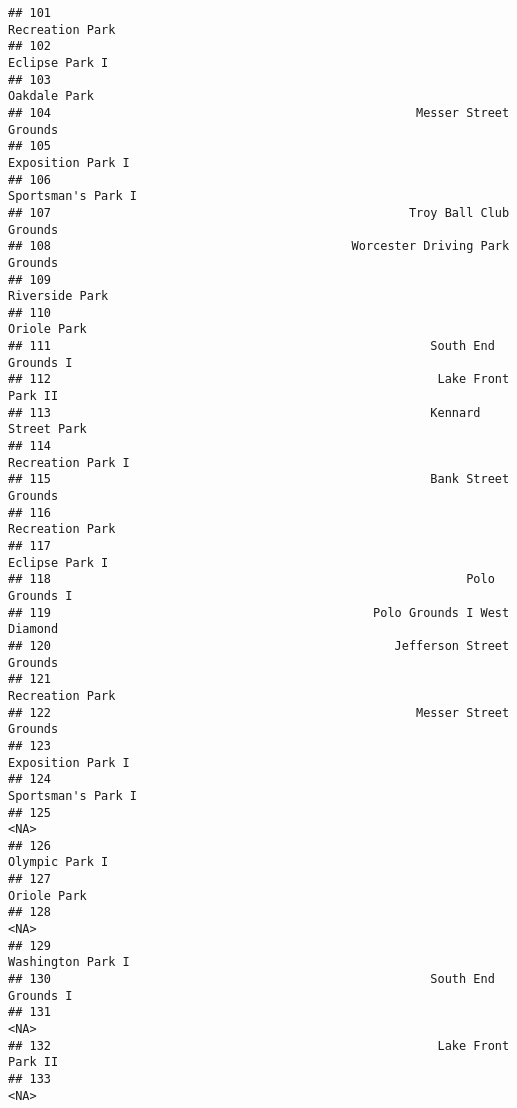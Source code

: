 \documentclass[]{article}
\begin{document}
\begin{verbatim}
## 101                                                         Recreation Park
## 102                                                          Eclipse Park I
## 103                                                            Oakdale Park
## 104                                                   Messer Street Grounds
## 105                                                       Exposition Park I
## 106                                                      Sportsman's Park I
## 107                                                  Troy Ball Club Grounds
## 108                                          Worcester Driving Park Grounds
## 109                                                          Riverside Park
## 110                                                             Oriole Park
## 111                                                     South End Grounds I
## 112                                                      Lake Front Park II
## 113                                                     Kennard Street Park
## 114                                                       Recreation Park I
## 115                                                     Bank Street Grounds
## 116                                                         Recreation Park
## 117                                                          Eclipse Park I
## 118                                                          Polo Grounds I
## 119                                             Polo Grounds I West Diamond
## 120                                                Jefferson Street Grounds
## 121                                                         Recreation Park
## 122                                                   Messer Street Grounds
## 123                                                       Exposition Park I
## 124                                                      Sportsman's Park I
## 125                                                                    <NA>
## 126                                                          Olympic Park I
## 127                                                             Oriole Park
## 128                                                                    <NA>
## 129                                                       Washington Park I
## 130                                                     South End Grounds I
## 131                                                                    <NA>
## 132                                                      Lake Front Park II
## 133                                                                    <NA>

\end{verbatim}
\end{document}
